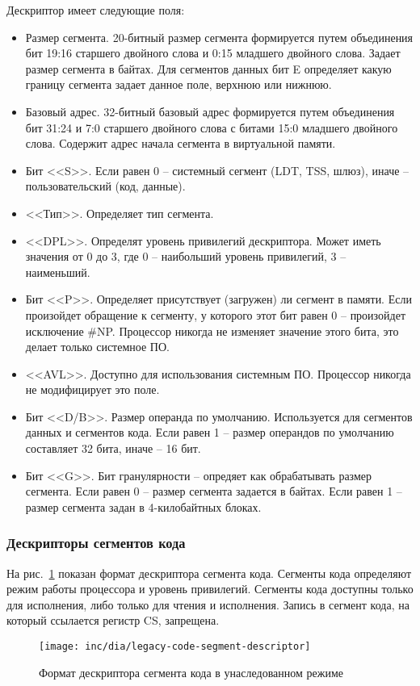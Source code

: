 Дескриптор имеет следующие поля:
\begin{itemize}
\item Размер сегмента. 20-битный размер сегмента формируется путем объединения
	бит 19:16 старшего двойного слова и 0:15 младшего двойного слова. Задает размер сегмента
	в байтах. Для сегментов данных бит E определяет какую границу сегмента задает данное поле,
	верхнюю или нижнюю.
\item Базовый адрес. 32-битный базовый адрес формируется путем объединения бит 31:24 и 7:0 старшего двойного слова
	с битами 15:0 младшего двойного слова. Содержит адрес начала сегмента в виртуальной памяти.
\item Бит <<S>>. Если равен 0 -- системный сегмент (LDT, TSS, шлюз), иначе -- пользовательский (код, данные).
\item <<Тип>>. Определяет тип сегмента.
\item <<DPL>>. Определят уровень привилегий дескриптора. Может иметь значения от 0 до 3, где 0 -- наибольший
	уровень привилегий, 3 -- наименьший.
\item Бит <<P>>. Определяет присутствует (загружен) ли сегмент в памяти. Если произойдет обращение к сегменту,
	у которого этот бит равен 0 -- произойдет исключение \#NP. Процессор никогда не изменяет значение
	этого бита, это делает только системное ПО.
\item <<AVL>>. Доступно для использования системным ПО. Процессор никогда не модифицирует это поле.
\item Бит <<D/B>>. Размер операнда по умолчанию. Используется для сегментов данных и сегментов кода.
	Если равен 1 -- размер операндов по умолчанию составляет 32 бита, иначе -- 16 бит.
\item Бит <<G>>. Бит гранулярности -- опредяет как обрабатывать размер сегмента. Если равен 0 -- размер сегмента
	задается в байтах. Если равен 1 -- размер сегмента задан в 4-килобайтных блоках.
\end{itemize}

\subsubsection*{Дескрипторы сегментов кода}
На рис.~\ref{fig:legacy-code-segment-descriptor-format} показан формат дескриптора сегмента кода.
Сегменты кода определяют режим работы процессора и уровень привилегий. Сегменты кода доступны только для исполнения,
либо только для чтения и исполнения. Запись в сегмент кода, на который ссылается регистр CS, запрещена.
\begin{figure}[ht!]
  \centering
  \texttt{[image: inc/dia/legacy-code-segment-descriptor]}
  \caption{Формат дескриптора сегмента кода в унаследованном режиме}
  \label{fig:legacy-code-segment-descriptor-format}
\end{figure}

